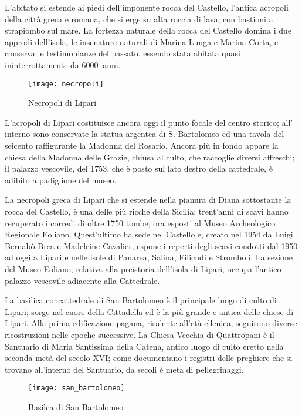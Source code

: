 \documentclass[fleqn,11pt]{SelfArx} %
\begin{document}
L'abitato si estende ai piedi dell'imponente rocca del Castello, l'antica acropoli della città greca e romana, che si erge su alta roccia di lava, con bastioni a strapiombo sul mare. La fortezza naturale della rocca del Castello domina i due approdi dell'isola, le insenature naturali di Marina Lunga e Marina Corta, e conserva le testimonianze del passato, essendo stata abitata quasi ininterrottamente da \(\SI{6000}{}\) anni.

\begin{figure}[ht]\centering
	\texttt{[image: necropoli]}
	\caption{Necropoli di Lipari}
	\label{fig:necropoli}
\end{figure}

L'acropoli di Lipari costituisce ancora oggi il punto focale del centro storico; all' interno sono conservate la statua argentea di S. Bartolomeo ed una tavola del seicento raffigurante la Madonna del Rosario. Ancora più in fondo appare la chiesa della Madonna delle Grazie, chiusa al culto, che raccoglie diversi affreschi; il palazzo vescovile, del 1753, che è posto sul lato destro della cattedrale, è adibito a padiglione del museo.

La necropoli greca di Lipari che si estende nella pianura di Diana sottostante la rocca del Castello, è una delle più ricche della Sicilia: trent'anni di scavi hanno recuperato i corredi di oltre 1750 tombe, ora esposti al Museo Archeologico Regionale Eoliano. Quest'ultimo ha sede nel Castello e, creato nel 1954 da Luigi Bernabò Brea e Madeleine Cavalier, espone i reperti degli scavi condotti dal 1950 ad oggi a Lipari e nelle isole di Panarea, Salina, Filicudi e Stromboli. La sezione del Museo Eoliano, relativa alla preistoria dell'isola di Lipari, occupa l'antico palazzo vescovile adiacente alla Cattedrale.

La basilica concattedrale di San Bartolomeo è il principale luogo di culto di Lipari; sorge nel cuore della Cittadella ed è la più grande e antica delle chiese di Lipari. Alla prima edificazione pagana, risalente all'età ellenica, seguirono diverse ricostruzioni nelle epoche successive.
La Chiesa Vecchia di Quattropani è il Santuario di Maria Santissima della Catena, antico luogo di culto eretto nella seconda metà del secolo XVI; come documentano i registri delle preghiere che si trovano all'interno del Santuario, da secoli è meta di pellegrinaggi.

\begin{figure}[ht]\centering
	\texttt{[image: san\_bartolomeo]}
	\caption{Basilca di San Bartolomeo}
	\label{fig:san_bartolomeo}
\end{figure}
 
\end{document}
